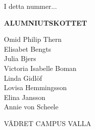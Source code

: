 \documentclass[10pt,final,hyphenatedtitles]{papertex}
\begin{document}
\begin{frontpage}
\begin{indexblock}{I detta nummer...}


\end{indexblock}

\begin{authorblock}

\textbf{ALUMNIUTSKOTTET}

Omid Philip Thern\\
Elisabet Bengts\\
Julia Bjers\\
Victoria Isabelle Boman\\
Linda Gidlöf\\
Lovisa Hemmingsson\\
Elina Jansson\\
Annie von Scheele\\

\end{authorblock}


\begin{weatherblock}{VÄDRET CAMPUS VALLA}
\end{weatherblock}





\end{frontpage}

\newsection{}



\newssep



\newssep



\newssep



\newssep



\newssep



\newssep



\clearpage


\end{document}

